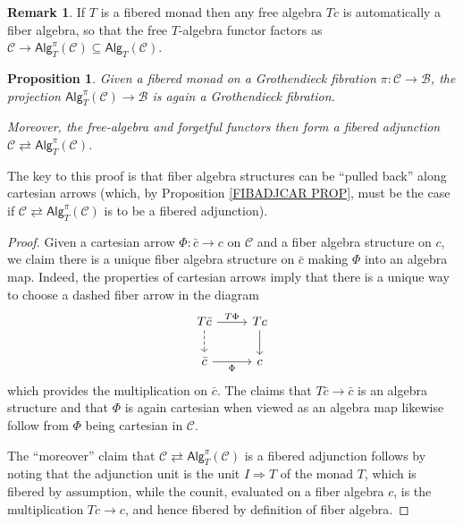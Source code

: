 \documentclass[a4paper,10pt
,draft
]{article}%
\numberwithin{equation}{section}
\numberwithin{figure}{section}
\newtheorem{proposition}[equation]{Proposition}%
\theoremstyle{definition} %
\newtheorem{remark}[equation]{Remark}%
\newcommand{\1}{\ensuremath{\mathbbm 1}}%
\begin{document}
\begin{remark}
If $T$ is a fibered monad then any free algebra $Tc$ is automatically a fiber algebra, so that the free $T$-algebra functor factors
as 
$\mathcal{C} \to \mathsf{Alg}^{\pi}_T(\mathcal{C}) \subseteq \mathsf{Alg}_T(\mathcal{C})$.
\end{remark}



\begin{proposition}\label{FIBALGGR PROP}
Given a fibered monad on a Grothendieck fibration $\pi \colon \mathcal{C} \to \mathcal{B}$,
the projection $\mathsf{Alg}^{\pi}_T(\mathcal{C}) \to \mathcal{B}$
is again a Grothendieck fibration.

Moreover, the free-algebra and forgetful functors then form a fibered adjunction
$\mathcal{C} \rightleftarrows \mathsf{Alg}^{\pi}_T(\mathcal{C})$.
\end{proposition}


The key to this proof is that fiber algebra structures can be ``pulled back'' along cartesian arrows
(which, by Proposition \ref{FIBADJCAR PROP}, must be the case if $\mathcal{C} \rightleftarrows \mathsf{Alg}^{\pi}_T(\mathcal{C})$ is to be a fibered adjunction). 



\begin{proof}
Given a cartesian arrow $\Phi \colon \bar{c} \to c$ on $\mathcal{C}$ and a fiber algebra structure on $c$, we claim there is a unique fiber algebra structure on $\bar{c}$ making $\Phi$ into an algebra map. Indeed, the properties of cartesian arrows imply that there is a unique way to choose a dashed fiber arrow in the diagram
\[
\begin{tikzcd}
	T \bar{c} \ar{r}{T \Phi} \ar[dashed]{d} & T c \ar{d}
\\
	\bar{c} \ar{r}[swap]{\Phi} & c
\end{tikzcd}
\]
which provides the multiplication on $\bar{c}$.
The claims that $T\bar{c} \to \bar{c}$ is an algebra structure and that 
$\Phi$ is again cartesian when viewed as an algebra map likewise follow from 
$\Phi$ being cartesian in $\mathcal{C}$.

The ``moreover'' claim that 
$\mathcal{C} \rightleftarrows \mathsf{Alg}^{\pi}_T(\mathcal{C})$
is a fibered adjunction
follows by noting that the adjunction unit is the unit
$I \Rightarrow T$ of the monad $T$, 
which is fibered by assumption,
while the counit, evaluated on a fiber algebra $c$, is the multiplication $Tc \to c$, and hence fibered by definition of fiber algebra.
\end{proof}
\end{document}
